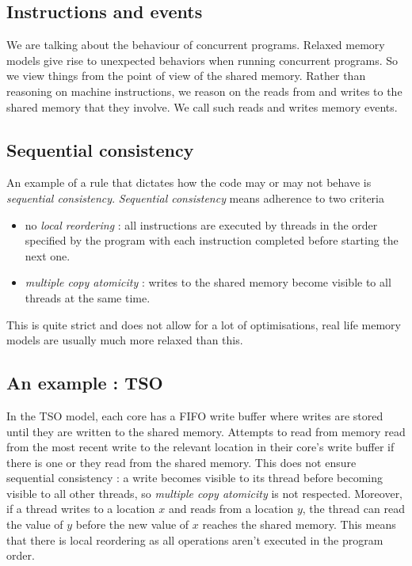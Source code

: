 \documentclass[a4,12pt]{article}
\begin{document}
\subsection{Instructions and events}

We are talking about the behaviour of concurrent programs. Relaxed memory models give rise to unexpected behaviors when running concurrent programs. So we view things from the point of view of the shared memory. Rather than reasoning on machine instructions, we reason on the reads from and writes to the shared memory that they involve. We call such reads and writes memory events.

\subsection{Sequential consistency}

An example of a rule that dictates how the code may or may not behave is \emph{sequential consistency}. \emph{Sequential consistency} means adherence to two criteria 
\begin{itemize}
\item no \emph{local reordering} : all instructions are executed by threads in the order specified by the program with each instruction completed before starting the next one.
\item \emph{multiple copy atomicity} : writes to the shared memory become visible to all threads at the same time.
\end{itemize}
This is quite strict and does not allow for a lot of optimisations, real life memory models are usually much more relaxed than this.

\subsection{An example : TSO}

In the TSO model, each core has a FIFO write buffer where writes are stored until they are written to the shared memory. Attempts to read from memory read from the most recent write to the relevant location in their core's write buffer if there is one or they read from the shared memory. This does not ensure sequential consistency : a write becomes visible to its thread before becoming visible to all other threads, so \emph{multiple copy atomicity} is not respected. Moreover, if a thread writes to a location $x$ and reads from a location $y$, the thread can read the value of $y$ before the new value of $x$ reaches the shared memory. This means that there is local reordering as all operations aren't executed in the program order.
\end{document}
